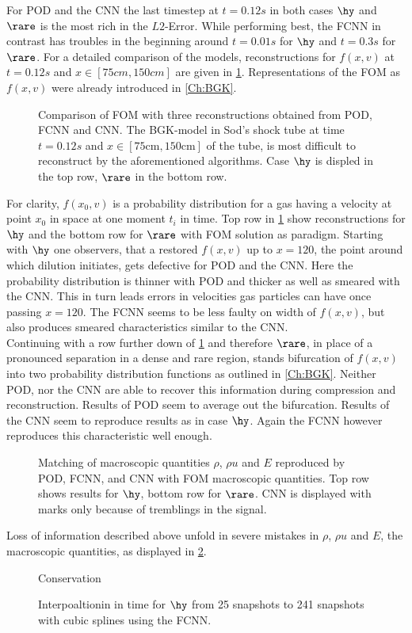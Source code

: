 For POD and the CNN the last timestep at $t=0.12s$ in both cases $\hy$ and $\rare$ is the most rich in the $L2$-Error. While performing best, the FCNN in contrast has troubles in the beginning around $t=0.01s$ for $\hy$  and $t=0.3s$ for $\rare$. For a detailed comparison of the models, reconstructions for $f(x,v)$ at $t=0.12s$ and $x \in [75cm,150cm]$ are given in \cref{Fig:ErrWorst}. Representations of the FOM as $f(x,v)$ were already introduced in \cref{Ch:BGK}.
\begin{figure}[hpb!]
	
	\caption{Comparison of FOM with three reconstructions obtained from POD, FCNN and CNN. The BGK-model in Sod's shock tube at time \(t=0.12s\) and \(x\in [75\textrm{cm}, 150\textrm{cm}]\) of the tube, is most difficult to reconstruct by the aforementioned algorithms. Case $\hy$ is displed in the top row, $\rare$ in the bottom row. }
	\label{Fig:ErrWorst}
\end{figure}
For clarity, $f(x_0,v)$ is a probability distribution for a gas having a velocity at point $x_0$ in space at one moment $t_i$ in time. Top row in \cref{Fig:ErrWorst} show reconstructions for $\hy$ and the bottom row for $\rare$ with FOM solution as paradigm. Starting with \(\hy\) one observers, that a restored \(f(x,v)\) up to \(x=120\), the point around which dilution initiates, gets defective for POD and the CNN. Here the probability distribution is thinner with POD and thicker as well as smeared with the CNN. This in turn leads errors in velocities gas particles can have once passing \(x=120\). The FCNN seems to be less faulty on width of \(f(x,v)\), but also produces smeared characteristics similar to the CNN.\\
Continuing with a row further down of \cref{Fig:ErrWorst} and therefore \(\rare\), in place of a pronounced separation in a dense and rare region, stands bifurcation of \(f(x,v)\) into two probability distribution functions as outlined in \cref{Ch:BGK}. Neither POD, nor the CNN are able to recover this information during compression and reconstruction. Results of POD seem to average out the bifurcation. Results of the CNN seem to reproduce results as in case \(\hy\). Again the FCNN however reproduces this characteristic well enough.\\      
\begin{figure}[htbp!]
	
	\caption{Matching of macroscopic quantities \(\rho\), \(\rho u\) and \(E\) reproduced by POD, FCNN, and CNN with FOM macroscopic quantities. Top row shows results for \(\hy\), bottom row for \(\rare\). CNN is displayed with marks only because of tremblings in the signal.}
	\label{Fig:ErrMacro}
\end{figure}
Loss of information described above unfold in severe mistakes in \(\rho\), \(\rho u\) and \(E\), the macroscopic quantities, as displayed in \cref{Fig:ErrMacro}.  
\begin{figure}
	
	\caption{Conservation}
\end{figure}
\begin{figure}
	
	\caption{Interpoaltionin in time for \(\hy\) from 25 snapshots to 241 snapshots with cubic splines using the FCNN.}
\end{figure}

